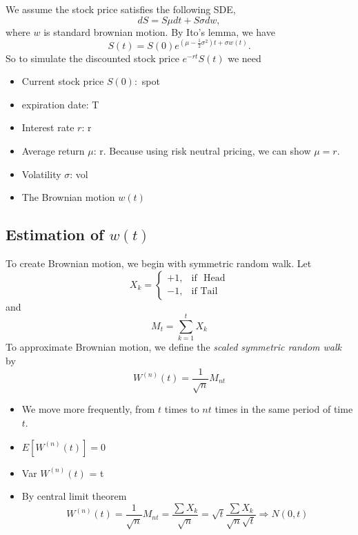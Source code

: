 \documentclass[12pt]{amsart}
\theoremstyle{definition}
\theoremstyle{remark}
\begin{document}
We assume the stock price satisfies the following SDE, 
\begin{equation*}
dS =  S \mu dt + S\sigma dw,
\end{equation*}
where $w$ is standard brownian motion.
By Ito's lemma, we have 
\begin{equation*}
S(t) = S(0) e^{(\mu -\frac{1}{2}\sigma ^2)t + \sigma w(t)}.
\end{equation*}
So to simulate the discounted stock price $e^{-rt}S(t)$ we need
 \begin{itemize}
 \item Current stock price $S(0): $ spot
 \item expiration date: T

 \item Interest rate $r$: r
  \item Average return $\mu$: r. Because using risk neutral pricing, we can show $\mu = r$.
 \item Volatility $\sigma$: vol
 \item The Brownian motion $w(t)$
 
 \end{itemize}

\subsection{Estimation of $w(t)$}

To create Brownian motion, we begin with symmetric random walk.
Let 
\begin{equation*}
X_k = \begin{cases} +1, & \mbox{if } \mbox{ Head} \\ -1, & \mbox{if } \mbox{Tail} \end{cases}
\end{equation*}
and
\begin{equation*}
M_t = \sum _{k = 1}^{t} X_k
\end{equation*}
To approximate Brownian motion, we define the {\it scaled symmetric random walk} by
\begin{equation*}
W^{(n)}(t)= \frac{1}{\sqrt{n}} M_{nt}
\end{equation*}
\begin{itemize}
\item We move more frequently, from $t$ times to $nt$ times in the same period of time $t$.
\item $E[W^{(n)}(t)]= 0$
\item Var $W^{(n)}(t)$ =  t
\item By central limit theorem
\begin{equation*}
W^{(n)}(t) =  \frac{1}{\sqrt{n}} M_{nt} = \frac{\sum X_k}{\sqrt{n}} = \sqrt{t}\frac{\sum X_k}{\sqrt{n} \sqrt{t}} \Rightarrow N(0,t)
\end{equation*}
\end{itemize}
\end{document}
